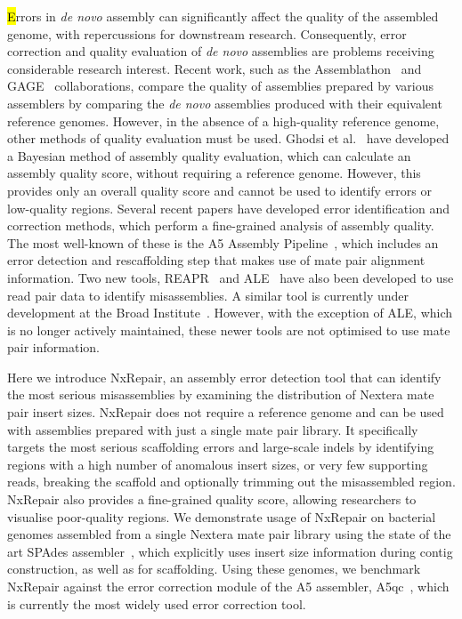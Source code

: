 \documentclass[fleqn,10pt]{wlpeerj}
\begin{document}
{\hl Errors in \textit{de novo} assembly can significantly affect the quality of the assembled genome, with repercussions for downstream research.} Consequently, error correction and quality evaluation of \textit{de novo} assemblies are problems receiving considerable research interest. Recent work, such as the Assemblathon~\citep{Bradnam2013} and GAGE~\citep{Salzberg2012} collaborations, compare the quality of assemblies prepared by various assemblers by comparing the \textit{de novo} assemblies produced with their equivalent reference genomes. However, in the absence of a high-quality reference genome, other methods of quality evaluation must be used. Ghodsi et al.~\citep{Ghodsi2013} have developed a Bayesian method of assembly quality evaluation, which can calculate an assembly quality score, without requiring a reference genome. However, this provides only an overall quality score and cannot be used to identify errors or low-quality regions. Several recent papers have developed error identification and correction methods, which perform a fine-grained analysis of assembly quality. The most well-known of these is the A5 Assembly Pipeline~\citep{Coil2014, tritt2012}, which includes an error detection and rescaffolding step that makes use of mate pair alignment information. Two new tools, REAPR~\citep{Hunt2013} and ALE~\citep{Clark2013} have also been developed to use read pair data to identify misassemblies. A similar tool is currently under development at the Broad Institute~\citep{pilon2014}. However, with the exception of ALE, which is no longer actively maintained, these newer tools are not optimised to use mate pair information.  

Here we introduce NxRepair, an assembly error detection tool that can identify the most serious misassemblies by examining the distribution of Nextera mate pair insert sizes. NxRepair does not require a reference genome and can be used with assemblies prepared with just a single mate pair library. It specifically targets the most serious scaffolding errors and large-scale indels by identifying regions with a high number of anomalous insert sizes, or very few supporting reads, breaking the scaffold and optionally trimming out the misassembled region. NxRepair also provides a fine-grained quality score, allowing researchers to visualise poor-quality regions. We demonstrate usage of NxRepair on bacterial genomes assembled from a single Nextera mate pair library using the state of the art SPAdes assembler~\citep{Bankevich2012}, which explicitly uses insert size information during contig construction, as well as for scaffolding. Using these genomes, we benchmark NxRepair against the error correction module of the A5 assembler, A5qc~\citep{tritt2012}, which is currently the most widely used error correction tool.
\end{document}
